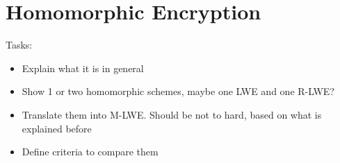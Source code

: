 \chapter{Homomorphic Encryption}
Tasks:
\begin{itemize}
    \item Explain what it is in general
    \item Show 1 or two homomorphic schemes, maybe one LWE and one R-LWE?
    \item Translate them into M-LWE. Should be not to hard, based on what is explained before
    \item Define criteria to compare them
\end{itemize}